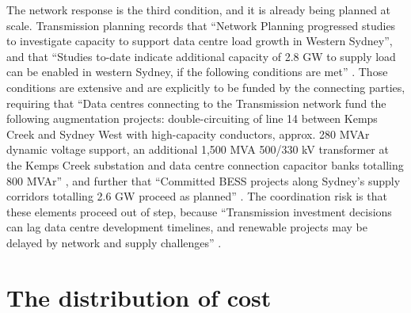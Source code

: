 The network response is the third condition, and it is already being planned at scale. Transmission planning records that \enquote{Network Planning progressed studies to investigate capacity to support data centre load growth in Western Sydney}, and that \enquote{Studies to-date indicate additional capacity of 2.8 GW to supply load can be enabled in western Sydney, if the following conditions are met} \autocite{transgridWesternSydneyAugmentation2024}. Those conditions are extensive and are explicitly to be funded by the connecting parties, requiring that \enquote{Data centres connecting to the Transmission network fund the following augmentation projects: double-circuiting of line 14 between Kemps Creek and Sydney West with high-capacity conductors, approx. 280 MVAr dynamic voltage support, an additional 1,500 MVA 500/330 kV transformer at the Kemps Creek substation and data centre connection capacitor banks totalling 800 MVAr} \autocite{transgridWesternSydneyAugmentation2024}, and further that \enquote{Committed BESS projects along Sydney's supply corridors totalling 2.6 GW proceed as planned} \autocite{transgridWesternSydneyAugmentation2024}. The coordination risk is that these elements proceed out of step, because \enquote{Transmission investment decisions can lag data centre development timelines, and renewable projects may be delayed by network and supply challenges} \autocite{usscPoweringCloud2025}.

\section{The distribution of cost}
\label{sec:supp:gen:distribution}

